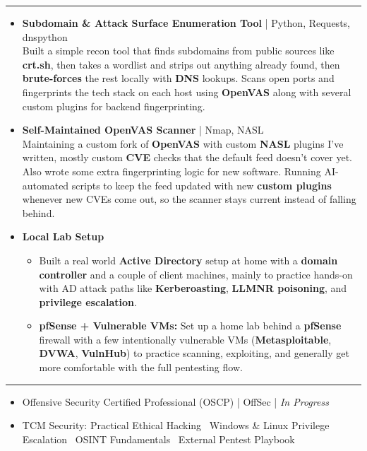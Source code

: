 \documentclass[9pt,a4paper]{extarticle}
\newcommand{\resumeSection}[1]{%
  \vspace{5pt}%
  \noindent{\large\bfseries\MakeUppercase{#1}}\par%
  \vspace{-7pt}%
  \noindent\rule{\textwidth}{0.5pt}%
  \par\vspace{0pt}%
}
\begin{document}
\resumeSection{Projects}
\begin{itemize}
  \item \textbf{Subdomain \& Attack Surface Enumeration Tool}
        | Python, Requests, dnspython \\
        Built a simple recon tool that finds subdomains from public sources like \textbf{crt.sh},
        then takes a wordlist and strips out anything already found,
        then \textbf{brute-forces} the rest locally with \textbf{DNS} lookups. Scans open ports and
        fingerprints the tech stack on each host using \textbf{OpenVAS} along with several
        custom plugins for backend fingerprinting.

  \item \textbf{Self-Maintained OpenVAS Scanner}
        | Nmap, NASL \\
        Maintaining a custom fork of \textbf{OpenVAS} with custom \textbf{NASL} plugins I've written,
        mostly custom \textbf{CVE} checks that the default feed doesn't cover yet. Also
        wrote some extra fingerprinting logic for new software. Running AI-automated
        scripts to keep the feed updated with new \textbf{custom plugins} whenever new CVEs
        come out, so the scanner stays current instead of falling behind.

  \item \textbf{Local Lab Setup}
        \begin{itemize}
        \item Built a real world \textbf{Active Directory} setup at home with a \textbf{domain controller}
              and a couple of client machines, mainly to practice hands-on with AD attack
              paths like \textbf{Kerberoasting}, \textbf{LLMNR poisoning}, and \textbf{privilege escalation}.
        \item \textbf{pfSense + Vulnerable VMs:} Set up a home lab behind a \textbf{pfSense}
              firewall with a few intentionally vulnerable VMs (\textbf{Metasploitable}, \textbf{DVWA}, \textbf{VulnHub})
              to practice scanning, exploiting, and generally get more comfortable
              with the full pentesting flow.
        \end{itemize}
\end{itemize}

\resumeSection{Certifications}

\begin{itemize}
  \item Offensive Security Certified Professional (OSCP) | OffSec | \textit{In Progress}
  \item TCM Security: Practical Ethical Hacking \textbullet\ Windows \& Linux Privilege Escalation \textbullet\ OSINT Fundamentals \textbullet\ External Pentest Playbook
\end{itemize}
\end{document}
